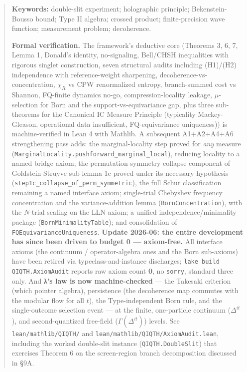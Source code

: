 \documentclass[11pt,a4paper]{article}
\begin{document}
\begin{abstract}
\medskip
\noindent\textbf{Keywords:} double-slit experiment; holographic principle; Bekenstein-Bousso bound; Type II algebra; crossed product; finite-precision wave function; measurement problem; decoherence.

\textbf{Formal verification.} The framework's deductive core (Theorems 3, 6, 7, Lemma 1, Donald's identity, no-signaling, Bell/CHSH inequalities with rigorous singlet construction, seven structural audits including (H1)/(H2) independence with reference-weight sharpening, decoherence-vs-concentration, $\chi_R$ vs CPW renormalized entropy, branch-summed cost vs Shannon, FQ-finite dynamics no-go, compression-locality leakage, $\mu$-selection for Born and the support-vs-equivariance gap, plus three sub-theorems for the Canonical IC Measure Principle (typicality Mackey-Gleason, operational data insufficient, FQ-equivariance uniqueness)) is machine-verified in Lean 4 with Mathlib. A subsequent A1+A2+A4+A6 strengthening pass adds: the marginal-locality step proved for \emph{any} measure (\texttt{MarginalLocality.pushforward\_marginal\_local}), reducing locality to a named bridge axiom; the permutation-symmetry collapse component of Goldstein-Struyve sub-lemma 1c proved under its necessary hypothesis (\texttt{step1c\_collapse\_of\_perm\_symmetric}), the full Schur classification remaining a named interface axiom; single-trial Chebyshev frequency concentration and the variance-addition lemma (\texttt{BornConcentration}), with the $N$-trial scaling on the LLN axiom; a unified independence/minimality package (\texttt{BornMinimalityTable}); and consolidation of \texttt{FQEquivarianceUniqueness}. \textbf{Update 2026-06: the entire development has since been driven to budget 0 — axiom-free.} All interface axioms (the continuum / operator-algebra ones and the Born sub-axioms) have been retired via typeclass-and-instance discharges; \texttt{lake build QIQTH.AxiomAudit} reports raw axiom count \textbf{0}, no \texttt{sorry}, standard three only. And \textbf{λ's law is now machine-checked} — the Takesaki criterion (which pointer algebra), persistence (the decoherence map commutes with the modular flow for all $t$), the Type-independent Born rule, and the single-outcome selection event — at the finite, one-particle continuum ($\Delta^{it}$), and second-quantized free-field ($\Gamma(\Delta^{it})$) levels. See \texttt{lean/mathlib/QIQTH/} and \texttt{lean/mathlib/QIQTH/AxiomAudit.lean}, including the worked double-slit instance (\texttt{QIQTH.DoubleSlit}) that exercises Theorem 6 on the screen-region branch decomposition discussed in §9A.
\end{abstract}
\end{document}
